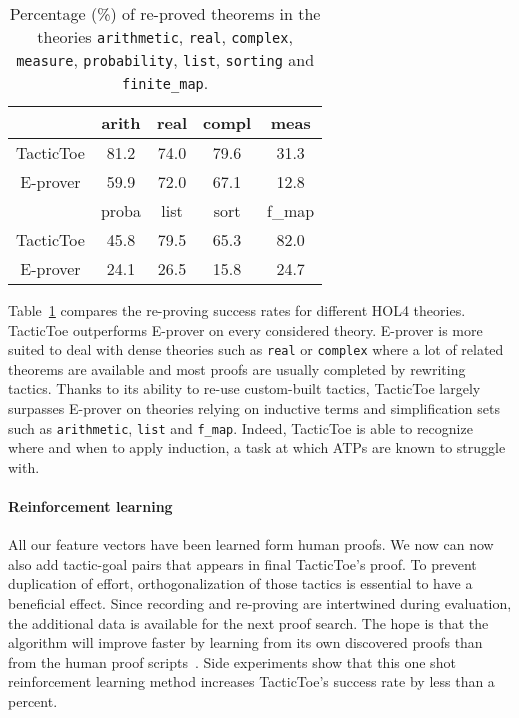 \documentclass[runningheads,a4paper,draft]{svjour3}
\def\holfour{\textsf{HOL4}\xspace}
\def\eprover{\textsf{E-prover}\xspace}
\def\tactictoe{\textsf{TacticToe}\xspace}
\begin{document}
\begin{table}[]
\centering
\setlength{\tabcolsep}{3mm}
\begin{tabular}{@{}ccccc@{}}
\toprule
\phantom{ab} & {arith} & {real} & {compl} & {meas} \\
\midrule
\tactictoe & 81.2 & 74.0 & 79.6 & 31.3\\
\eprover & 59.9 & 72.0 & 67.1 & 12.8\\
\midrule
\phantom{abc} & {proba} & {list} & {sort} & {f\_map} \\
\midrule
\tactictoe & 45.8 & 79.5 & 65.3 & 82.0 \\
\eprover & 24.1 & 26.5 & 15.8 & 24.7 \\
\bottomrule
\end{tabular}
\caption{\label{theories}Percentage (\%) of re-proved theorems in the theories
\texttt{arithmetic}, \texttt{real}, \texttt{complex}, \texttt{measure},
\texttt{probability}, \texttt{list}, \texttt{sorting} and \texttt{finite\_map}.
}
\end{table}

Table~\ref{theories} compares the re-proving success rates for different
\holfour theories. \tactictoe outperforms \eprover on every
considered theory.
\eprover is more suited to deal with dense theories such as
\texttt{real} or \texttt{complex} where a lot of related theorems are available
and most proofs are usually completed by rewriting tactics. Thanks to its
ability to re-use custom-built tactics, \tactictoe
largely surpasses \eprover on theories relying on inductive terms and
simplification sets such as \texttt{arithmetic}, \texttt{list}
and \texttt{f\_map}. Indeed, \tactictoe is able to recognize where and when to
apply induction, a task at which ATPs are known to struggle with.

\paragraph{Reinforcement learning}
All our feature vectors have been learned form human proofs. We now can now
also add tactic-goal pairs that appears in final \tactictoe's proof. To prevent
duplication of effort, orthogonalization of those
tactics is essential to have a beneficial effect.
Since recording and re-proving are intertwined during evaluation, the
additional data is available for the next proof search.
The hope is that the algorithm will improve faster by learning from its own
discovered proofs than from the human proof
scripts~\cite{DBLP:conf/cade/Urban07}. Side experiments show that
this one shot reinforcement learning method increases \tactictoe's success rate
by less than a percent.
\end{document}

